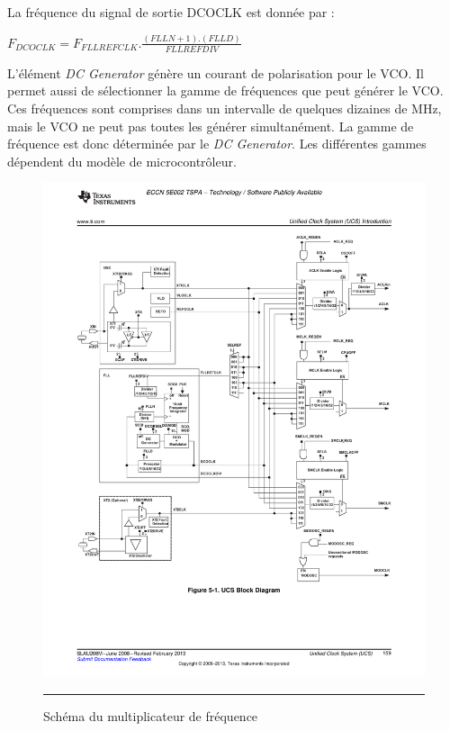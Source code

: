 La fréquence du signal de sortie DCOCLK est donnée par :
\begin{tabbing}
\begin{Large}
\qquad $F_{DCOCLK}=F_{FLLREFCLK}.\frac{(FLLN+1).(FLLD)}{FLLREFDIV}$
\end{Large}
\end{tabbing}
\bigskip
L'élément \textit{DC Generator} génère un courant de polarisation pour le VCO. Il permet aussi de sélectionner la gamme de fréquences que peut générer le VCO. Ces fréquences sont comprises dans un intervalle de quelques dizaines de MHz, mais le VCO ne peut pas toutes les générer simultanément. La gamme de fréquence est donc déterminée par le \textit{DC Generator}. Les différentes gammes dépendent du modèle de microcontrôleur.

\begin{figure}[htb]
  \centering
  \includegraphics [angle=0, width=14cm]{./Figures/Chap6_Horloges/UCS_FLL.pdf}
  \rule{35em}{0.5pt}
  \caption{Schéma du multiplicateur de fréquence}
  \label{fig:UCS_FLL}
\end{figure}

